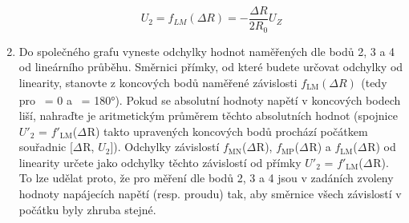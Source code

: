 \documentclass[a4paper,12pt]{article}   %
\newcommand{\var}[2]{$#1_\text{#2}$}
\begin{document}
\begin{enumerate}
    \begin{equation}
      U_2 = f_{LM}(\Delta R) = -\frac{\Delta R}{2R_0}U_Z
    \end{equation}
    \item Do společného grafu vyneste odchylky hodnot naměřených dle bodů 2, 3 a 4 od lineárního průběhu. Směrnici přímky, od které budete určovat odchylky od linearity, stanovte z koncových bodů naměřené závislosti \var{f}{LM}\var{(\Delta R)}{} (tedy pro \textalpha\ = 0 a \textalpha\ = 180°). Pokud se absolutní hodnoty napětí v koncových bodech liší, nahraďte je aritmetickým průměrem těchto absolutních hodnot (spojnice \var{U'}{2} = \var{f'}{LM}(\var{\Delta}{}R) takto upravených koncových bodů prochází počátkem souřadnic [\var{\Delta}{}R, \var{U}{2}]). Odchylky závislostí \var{f}{MN}(\var{\Delta}{}R), \var{f}{MP}(\var{\Delta}{}R) a \var{f}{LM}(\var{\Delta}{}R) od linearity určete jako odchylky těchto závislostí od přímky \var{U'}{2} = \var{f'}{LM}(\var{\Delta}{}R). To lze udělat proto, že pro měření dle bodů 2, 3 a 4 jsou v zadáních zvoleny hodnoty napájecích napětí (resp. proudu) tak, aby směrnice všech závislostí v počátku byly zhruba stejné.
\end{enumerate}
\end{document}
